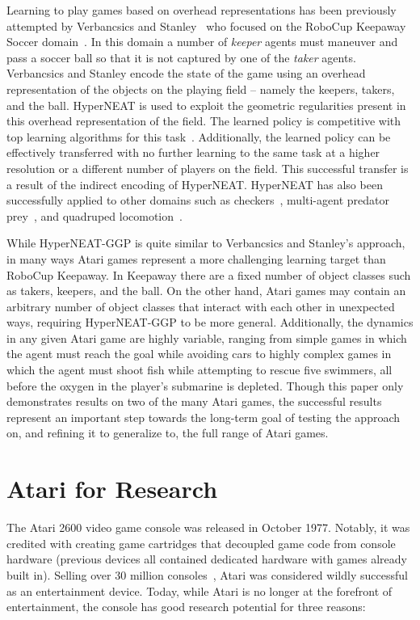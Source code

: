 \documentclass{acm_proc_article-sp}
\begin{document}
Learning to play games based on overhead representations has been previously attempted by Verbancsics and Stanley~\cite{verbancsics10} who focused on the RoboCup Keepaway Soccer domain~\cite{stone01}. In this domain a number of \textit{keeper} agents must maneuver and pass a soccer ball so that it is not captured by one of the \textit{taker} agents. Verbancsics and Stanley encode the state of the game using an overhead representation of the objects on the playing field -- namely the keepers, takers, and the ball. HyperNEAT is used to exploit the geometric regularities present in this overhead representation of the field.  The learned policy is competitive with top learning algorithms for this task~\cite{stone05}. Additionally, the learned policy can be effectively transferred with no further learning to the same task at a higher resolution or a different number of players on the field. This successful transfer is a result of the indirect encoding of HyperNEAT. HyperNEAT has also been successfully applied to other domains such as checkers~\cite{gauci08}, multi-agent predator prey~\cite{ambrosio08}, and quadruped locomotion~\cite{clune09}. 

While HyperNEAT-GGP is quite similar to Verbancsics and Stanley's approach, in many ways Atari games represent a more challenging learning target than RoboCup Keepaway. In Keepaway there are a fixed number of object classes such as takers, keepers, and the ball. On the other hand, Atari games may contain an arbitrary number of object classes that interact with each other in unexpected ways, requiring HyperNEAT-GGP to be more general. Additionally, the dynamics in any given Atari game are highly variable, ranging from simple games in which the agent must reach the goal while avoiding cars to highly complex games in which the agent must shoot fish while attempting to rescue five swimmers, all before the oxygen in the player's submarine is depleted. Though this paper only demonstrates results on two of the many Atari games, the successful results represent an important step towards the long-term goal of testing the approach on, and refining it to generalize to, the full range of Atari games.

\section{Atari for Research}
\label{sec:atari}
The Atari 2600 video game console was released in October 1977. Notably, it was credited with creating game cartridges that decoupled game code from console hardware (previous devices all contained dedicated hardware with games already built in). Selling over 30 million consoles~\cite{atarihist}, Atari was considered wildly successful as an entertainment device. Today, while Atari is no longer at the forefront of entertainment, the console has good research potential for three reasons:
\end{document}
